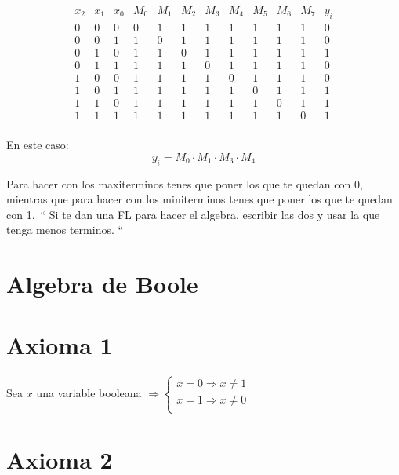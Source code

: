 \documentclass{report}
\begin{document}
$$\begin{array}{ccc|cccccccc|c}
		x_2 & x_1 & x_0 & M_0 & M_1 & M_2 & M_3 & M_4 & M_5 & M_6 & M_7 & y_i \\ \hline
		0   & 0   & 0   & 0   & 1   & 1   & 1   & 1   & 1   & 1   & 1   & 0   \\
		0   & 0   & 1   & 1   & 0   & 1   & 1   & 1   & 1   & 1   & 1   & 0   \\
		0   & 1   & 0   & 1   & 1   & 0   & 1   & 1   & 1   & 1   & 1   & 1   \\
		0   & 1   & 1   & 1   & 1   & 1   & 0   & 1   & 1   & 1   & 1   & 0   \\
		1   & 0   & 0   & 1   & 1   & 1   & 1   & 0   & 1   & 1   & 1   & 0   \\
		1   & 0   & 1   & 1   & 1   & 1   & 1   & 1   & 0   & 1   & 1   & 1   \\
		1   & 1   & 0   & 1   & 1   & 1   & 1   & 1   & 1   & 0   & 1   & 1   \\
		1   & 1   & 1   & 1   & 1   & 1   & 1   & 1   & 1   & 1   & 0   & 1   \\
	\end{array}$$

En este caso:
$$ y_i = M_0 \cdot M_1 \cdot M_3 \cdot M_4 $$

Para hacer con los maxiterminos tenes que poner los que te quedan con 0, mientras que para hacer con los miniterminos tenes que poner los que te quedan con 1.\
``
Si te dan una FL para hacer el algebra, escribir las dos y usar la que tenga menos terminos.
``


\section{Algebra de Boole}

\section{Axioma 1}

Sea $x$ una variable booleana $\Rightarrow \begin{cases}
		x=0 \Rightarrow x\ne 1 \\
		x=1 \Rightarrow x\ne 0 \\
	\end{cases}$

\section{Axioma 2}
\end{document}
